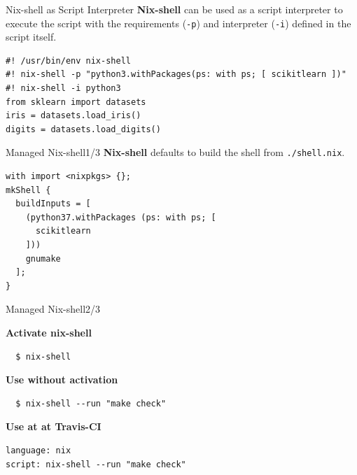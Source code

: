 \documentclass[12pt,aspectratio=169]{beamer}
\begin{document}

\begin{frame}[fragile]{Nix-shell as Script Interpreter}
  \textbf{Nix-shell} can be used as a script interpreter to execute the script with the requirements (\texttt{-p}) and interpreter (\texttt{-i}) defined in the script itself.
  \begin{verbatim}
#! /usr/bin/env nix-shell
#! nix-shell -p "python3.withPackages(ps: with ps; [ scikitlearn ])"
#! nix-shell -i python3
from sklearn import datasets
iris = datasets.load_iris()
digits = datasets.load_digits()
  \end{verbatim}
\end{frame}


\begin{frame}[fragile]{Managed Nix-shell\hfill1/3}
  \textbf{Nix-shell} defaults to build the shell from \texttt{./shell.nix}.
  \begin{verbatim}
with import <nixpkgs> {};
mkShell {
  buildInputs = [
    (python37.withPackages (ps: with ps; [
      scikitlearn
    ]))
    gnumake
  ];
}
  \end{verbatim}
\end{frame}


\begin{frame}[fragile]{Managed Nix-shell\hfill2/3}

  \textbf{Activate nix-shell}
  \begin{verbatim}
  $ nix-shell
  \end{verbatim}

  \textbf{Use without activation}
  \begin{verbatim}
  $ nix-shell --run "make check"
  \end{verbatim}

  \textbf{Use at at Travis-CI}
  \begin{verbatim}
language: nix
script: nix-shell --run "make check"
  \end{verbatim}

\end{frame}

\end{document}
